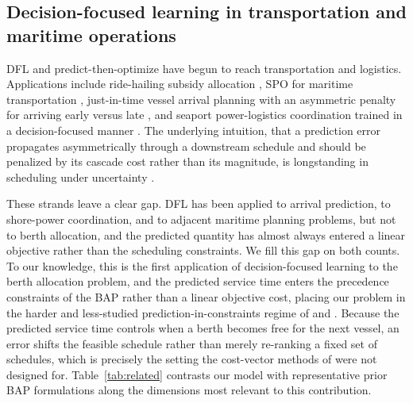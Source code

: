 \subsection{Decision-focused learning in transportation and maritime operations}\label{sec:related-gap}

DFL and predict-then-optimize have begun to reach transportation and logistics. Applications include ride-hailing subsidy allocation \citep{yang2025ridehailing}, SPO for maritime transportation \citep{tian2023smart}, just-in-time vessel arrival planning with an asymmetric penalty for arriving early versus late \citep{sheng2026jit}, and seaport power-logistics coordination trained in a decision-focused manner \citep{pu2025predictthenoptimize}. The underlying intuition, that a prediction error propagates asymmetrically through a downstream schedule and should be penalized by its cascade cost rather than its magnitude, is longstanding in scheduling under uncertainty \citep{herroelen2005project, fu2024robustifying}.

These strands leave a clear gap. DFL has been applied to arrival prediction, to shore-power coordination, and to adjacent maritime planning problems, but not to berth allocation, and the predicted quantity has almost always entered a linear objective rather than the scheduling constraints. We fill this gap on both counts. To our knowledge, this is the first application of decision-focused learning to the berth allocation problem, and the predicted service time enters the precedence constraints of the BAP rather than a linear objective cost, placing our problem in the harder and less-studied prediction-in-constraints regime of \citet{hu2023twostage} and \citet{mandi2025feasibility}. Because the predicted service time controls when a berth becomes free for the next vessel, an error shifts the feasible schedule rather than merely re-ranking a fixed set of schedules, which is precisely the setting the cost-vector methods of \citet{elmachtoub2022spo} were not designed for. Table~\ref{tab:related} contrasts our model with representative prior BAP formulations along the dimensions most relevant to this contribution.

